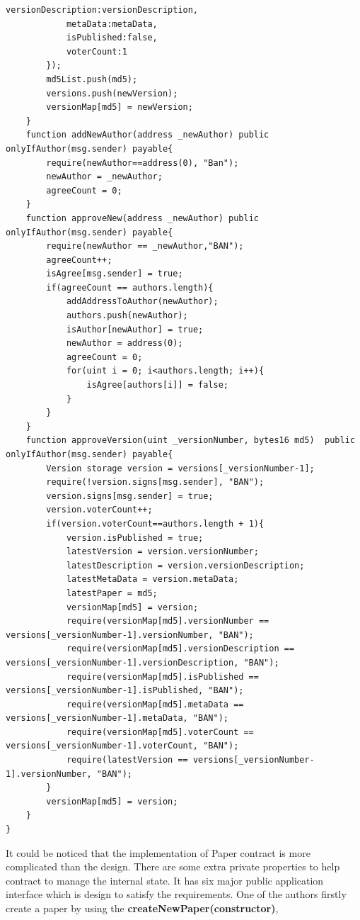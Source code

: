 \documentclass{ecsthesis}      %
\begin{document}
\begin{lstlisting}[language=Solidity]
            versionDescription:versionDescription,
            metaData:metaData,
            isPublished:false,
            voterCount:1
        });
        md5List.push(md5);
        versions.push(newVersion);
        versionMap[md5] = newVersion;
    }
    function addNewAuthor(address _newAuthor) public onlyIfAuthor(msg.sender) payable{
        require(newAuthor==address(0), "Ban");
        newAuthor = _newAuthor;
        agreeCount = 0;
    }
    function approveNew(address _newAuthor) public onlyIfAuthor(msg.sender) payable{
        require(newAuthor == _newAuthor,"BAN");
        agreeCount++;
        isAgree[msg.sender] = true;
        if(agreeCount == authors.length){
            addAddressToAuthor(newAuthor);
            authors.push(newAuthor);
            isAuthor[newAuthor] = true;
            newAuthor = address(0);
            agreeCount = 0;
            for(uint i = 0; i<authors.length; i++){
                isAgree[authors[i]] = false;
            }
        }
    }
    function approveVersion(uint _versionNumber, bytes16 md5)  public onlyIfAuthor(msg.sender) payable{
        Version storage version = versions[_versionNumber-1];
        require(!version.signs[msg.sender], "BAN");
        version.signs[msg.sender] = true;
        version.voterCount++;
        if(version.voterCount==authors.length + 1){
            version.isPublished = true;
            latestVersion = version.versionNumber;
            latestDescription = version.versionDescription;
            latestMetaData = version.metaData;
            latestPaper = md5;
            versionMap[md5] = version;
            require(versionMap[md5].versionNumber == versions[_versionNumber-1].versionNumber, "BAN");
            require(versionMap[md5].versionDescription == versions[_versionNumber-1].versionDescription, "BAN");
            require(versionMap[md5].isPublished == versions[_versionNumber-1].isPublished, "BAN");
            require(versionMap[md5].metaData == versions[_versionNumber-1].metaData, "BAN");
            require(versionMap[md5].voterCount == versions[_versionNumber-1].voterCount, "BAN");
            require(latestVersion == versions[_versionNumber-1].versionNumber, "BAN");
        }
        versionMap[md5] = version;
    }
} 
\end{lstlisting}
It could be noticed that the implementation of Paper contract is more complicated than the design. 
There are some extra private properties to help contract to manage the internal state. 
It has six major public application interface which is design to satisfy the requirements.
One of the authors firstly create a paper by using the \textbf{createNewPaper(constructor)}, 
\end{document}
